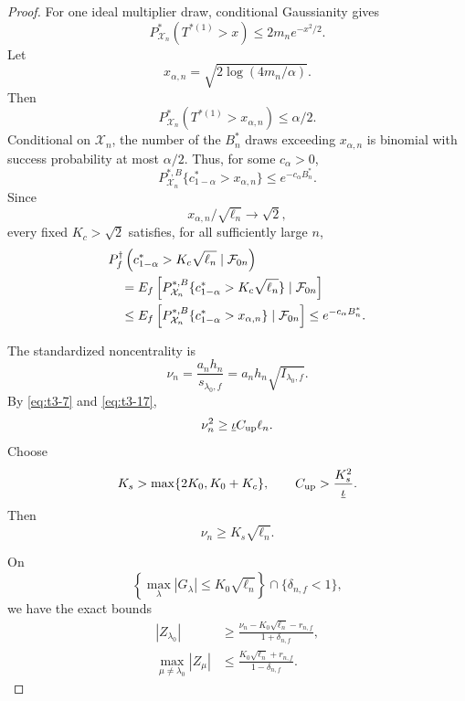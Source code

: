 \documentclass[11pt]{article}
\theoremstyle{definition}
\newcommand{\1}{\mathbf 1}\newcommand{\op}{\operatorname}
\begin{document}
\begin{proof}
For one ideal multiplier draw, conditional Gaussianity gives
\[
P_{\mathcal X_n}^*(T^{*(1)}>x)
\le
2m_ne^{-x^2/2}.
\]
Let
\[
x_{\alpha,n}
=
\sqrt{2\log(4m_n/\alpha)}.
\]
Then
\[
P_{\mathcal X_n}^*
(T^{*(1)}>x_{\alpha,n})
\le\alpha/2.
\]
Conditional on \(\mathcal X_n\), the number of the \(B_n^*\) draws
exceeding \(x_{\alpha,n}\) is binomial with success probability at
most \(\alpha/2\).  Thus, for some \(c_\alpha>0\),
\begin{equation}
P_{\mathcal X_n}^{*,B}
\{c_{1-\alpha}^*>x_{\alpha,n}\}
\le
e^{-c_\alpha B_n^*}.
\label{eq:t3-32}
\end{equation}
Since
\[
x_{\alpha,n}/\sqrt{\ell_n}\longrightarrow\sqrt2,
\]
every fixed \(K_c>\sqrt2\) satisfies, for all sufficiently large \(n\),
\begin{align}
&P_f^\dagger\left(
c_{1-\alpha}^*>K_c\sqrt{\ell_n}
\mid\mathcal F_{0n}
\right)
\notag\\
&\quad=
E_f\left[
P_{\mathcal X_n}^{*,B}
\{c_{1-\alpha}^*>K_c\sqrt{\ell_n}\}
\mid\mathcal F_{0n}
\right]
\notag\\
&\quad\le
E_f\left[
P_{\mathcal X_n}^{*,B}
\{c_{1-\alpha}^*>x_{\alpha,n}\}
\mid\mathcal F_{0n}
\right]
\le
e^{-c_\alpha B_n^*}.
\label{eq:t3-33}
\end{align}

The standardized noncentrality is
\[
\nu_n
=
\frac{a_n h_n}{s_{\lambda_0,f}}
=
a_n h_n\sqrt{I_{\lambda_0,f}}.
\]
By \eqref{eq:t3-7} and \eqref{eq:t3-17},
\[
\nu_n^2
\ge
\underline\iota C_{\rm up}\ell_n.
\]
Choose
\[
K_s>\max\{2K_0,K_0+K_c\},
\qquad
C_{\rm up}>
\frac{K_s^2}{\underline\iota}.
\]
Then
\begin{equation}
\nu_n
\ge
K_s\sqrt{\ell_n}.
\label{eq:t3-34}
\end{equation}

On
\[
\left\{
\max_\lambda|G_\lambda|
\le K_0\sqrt{\ell_n}
\right\}
\cap
\{\delta_{n,f}<1\},
\]
we have the exact bounds
\begin{align}
|Z_{\lambda_0}|
&\ge
\frac{
\nu_n-K_0\sqrt{\ell_n}-r_{n,f}
}{
1+\delta_{n,f}
},
\label{eq:t3-35}\\
\max_{\mu\ne\lambda_0}|Z_\mu|
&\le
\frac{
K_0\sqrt{\ell_n}+r_{n,f}
}{
1-\delta_{n,f}
}.
\label{eq:t3-36}
\end{align}


\end{proof}
\end{document}
